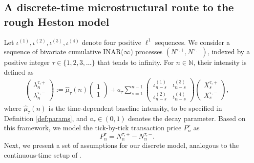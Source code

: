 \documentclass[letterpaper]{article}
\numberwithin{equation}{section}
\theoremstyle{definition}
\theoremstyle{remark}
\begin{document}
\subsection{A discrete-time microstructural route to the rough Heston model}
Let $\iota^{(1)}, \iota^{(2)}, \iota^{(3)}, \iota^{(4)}$ denote four positive $\ell^1$ sequences.
 We consider a sequence of bivariate cumulative INAR($\infty$) processes $(N^{\tau,+}, N^{\tau,-})$, indexed by a positive integer $\tau \in \{1, 2, 3, \dots\}$ that tends to infinity. For $n \in \mathbb{N}$, their intensity is defined as
\begin{align*}
    \begin{pmatrix}
        \lambda_n^{\tau,+} \\
        \lambda_n^{\tau,-}
    \end{pmatrix}
    := \hat{\mu}_{\tau}(n) 
    \begin{pmatrix}
        1 \\
        1
    \end{pmatrix}
    + a_{\tau} \sum_{s=1}^{n-1} 
    \begin{pmatrix}
        \iota_{n-s}^{(1)} & \iota_{n-s}^{(3)} \\
        \iota_{n-s}^{(2)} & \iota_{n-s}^{(4)}
    \end{pmatrix}
    \begin{pmatrix}
        X_s^{\tau,+} \\
        X_s^{\tau,-}
    \end{pmatrix},
\end{align*}
where $\hat{\mu}_{\tau}(n)$ is the time-dependent baseline intensity, to be specified in Definition \ref{def:params}, and $a_{\tau}\in(0,1)$ denotes the decay parameter. Based on this framework, we model the tick-by-tick transaction price $P_n^{\tau}$ as
\[
    P_n^{\tau} = N_n^{\tau,+} - N_n^{\tau,-}.
\]
Next, we present a set of assumptions for our discrete model, analogous to the continuous-time setup of \cite{el2019characteristic}.
\end{document}
